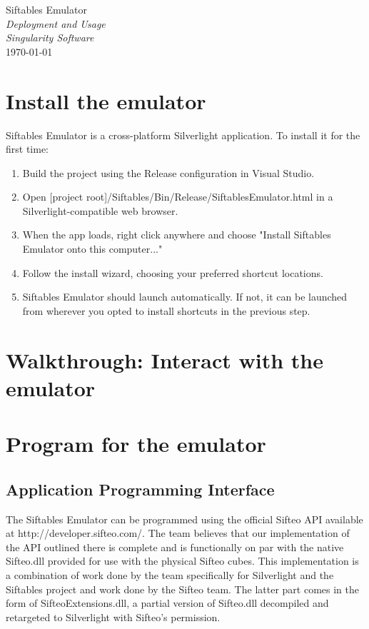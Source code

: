 \documentclass[12pt]{article}
\begin{document}
\begin{center}
	\LARGE{Siftables Emulator} \\
	\LARGE{\textit{Deployment and Usage}}\\
	\Large{\textit{Singularity Software}} \\
	\vspace{.05in}
	\normalsize{\today} \\
\end{center}

\section{Install the emulator}
Siftables Emulator is a cross-platform Silverlight application. To install it for the first time:
\begin{enumerate}
\item Build the project using the Release configuration in Visual Studio.
\item Open [project root]/Siftables/Bin/Release/SiftablesEmulator.html in a Silverlight-compatible web browser.
\item When the app loads, right click anywhere and choose "Install Siftables Emulator onto this computer..."
\item Follow the install wizard, choosing your preferred shortcut locations.
\item Siftables Emulator should launch automatically. If not, it can be launched from wherever you opted to install shortcuts in the previous step.
\end{enumerate}

\section{Walkthrough: Interact with the emulator}

\section{Program for the emulator}
\subsection{Application Programming Interface}
The Siftables Emulator can be programmed using the official Sifteo API available at http://developer.sifteo.com/. The team believes that our implementation of the API outlined there is complete and is functionally on par with the native Sifteo.dll provided for use with the physical Sifteo cubes. This implementation is a combination of work done by the team specifically for Silverlight and the Siftables project and work done by the Sifteo team. The latter part comes in the form of SifteoExtensions.dll, a partial version of Sifteo.dll decompiled and retargeted to Silverlight with Sifteo's permission.
\end{document}
